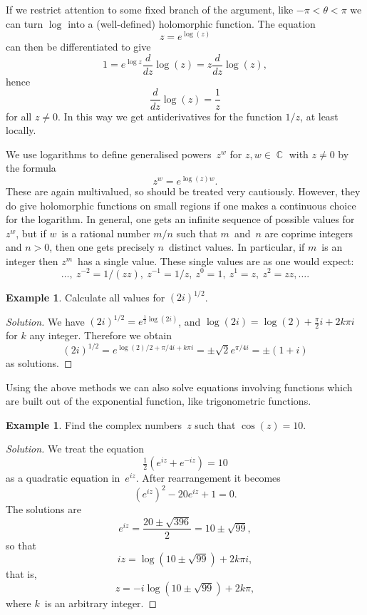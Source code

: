 \documentclass{amsproc}
\theoremstyle{definition}
\newtheorem{example}[theorem]{Example}
\newenvironment{solution}{\begin{proof}[Solution]}{\end{proof}}
\theoremstyle{remark}
\DeclareMathOperator{\C}{\mathbb{C}}
\numberwithin{equation}{section}
\begin{document}
If we restrict attention to some fixed branch of the argument, like $ -\pi < \theta < \pi $ we can turn $ \log $ into a (well-defined) holomorphic function.
The equation
$$
z = e^{\log(z)}
$$
can then be differentiated
to give
$$
1 = e^{\log z} \dfrac{d}{dz}\log(z) = z \dfrac{d}{dz} \log(z),
$$
hence
$$
\dfrac{d}{dz}\log(z) = \dfrac{1}{z}
$$
for all $ z \neq 0 $. In this way we get antiderivatives for the function $ 1/z $, at least locally.

We use logarithms to define generalised powers~$ z^w $ for $ z,w \in \C $ with $ z \neq 0 $ by the formula
$$
z^w = e^{\log(z) w}.
$$
These are again multivalued, so should be treated very cautiously. However, they do give holomorphic functions on small regions if one makes a continuous choice for the logarithm.
In general, one gets an infinite sequence of possible values for $ z^w $, but if $ w $~is a rational number $ m/n $ such that $ m $~and~$ n $ are coprime integers and $ n > 0 $,
then one gets precisely $ n $~distinct values. In particular, if $ m $~is an integer then $ z^m $~has a single value. These single values are as one would expect:
$$
\dots,\ z^{-2} = 1/(zz),\ z^{-1} = 1/z,\  z^0 = 1,\ z^1 = z,\ z^2 = zz, \dots.
$$

\begin{example} \label{CME3.2}
Calculate all values for $ (2i)^{1/2} $.
\end{example}

\begin{solution}
We have $ (2i)^{1/2} = e^{\tfrac{1}{2}\log(2i)} $, and $ \log(2i) = \log(2) + \frac{\pi}{2}i + 2k\pi i $ for $ k $ any integer. Therefore we obtain
$$
(2i)^{1/2} = e^{\log(2)/2 + \pi/4 i + k \pi i} = \pm \sqrt{2} e^{\pi/4 i} = \pm (1 + i)
$$
as solutions.
\end{solution}

Using the above methods we can also solve equations involving functions which are built out of the exponential function, like trigonometric functions.

\begin{example} \label{CME3.2}
Find the complex numbers~$ z $ such that $ \cos(z) = 10 $.
\end{example}

\begin{solution}
We treat the equation
$$
\tfrac{1}{2}(e^{iz} + e^{-iz}) = 10
$$
as a quadratic equation in~$ e^{iz} $. After rearrangement it becomes
$$
(e^{iz})^2-20 e^{iz} + 1 = 0.
$$
The solutions are
$$
e^{iz} = \dfrac{20\pm\sqrt{396}}{2} = 10\pm\sqrt{99},
$$
so that
$$
iz = \log(10\pm\sqrt{99}) + 2k\pi i,
$$
that is,
$$
z = -i\log(10\pm\sqrt{99}) + 2k\pi,
$$
where $ k $~is an arbitrary integer.
\end{solution}
\end{document}
